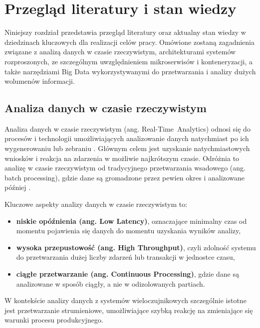 \section{Przegląd literatury i stan wiedzy}
\label{sec:przeglad_literatury}

Niniejszy rozdział przedstawia przegląd literatury oraz aktualny stan wiedzy w dziedzinach kluczowych dla realizacji celów pracy. Omówione zostaną zagadnienia związane z analizą danych w czasie rzeczywistym, architekturami systemów rozproszonych, ze szczególnym uwzględnieniem mikroserwisów i konteneryzacji, a także narzędziami Big Data wykorzystywanymi do przetwarzania i analizy dużych wolumenów informacji.

\subsection{Analiza danych w czasie rzeczywistym}
\label{subsec:analiza_danych}

Analiza danych w czasie rzeczywistym (ang. \mbox{Real-Time Analytics}) odnosi się do procesów i technologii umożliwiających analizowanie danych natychmiast po ich wygenerowaniu lub zebraniu \cite{realtime_analytics}. Głównym celem jest uzyskanie natychmiastowych wniosków i reakcja na zdarzenia w możliwie najkrótszym czasie. Odróżnia to analizę w czasie rzeczywistym od tradycyjnego przetwarzania wsadowego (ang. batch processing), gdzie dane są gromadzone przez pewien okres i analizowane później \cite{data_processing_models}.

\vspace{0.3em}

Kluczowe aspekty analizy danych w czasie rzeczywistym to:

\begin{itemize}
    \item \textbf{niskie opóźnienia (ang. Low Latency)}, oznaczające minimalny czas od momentu pojawienia się danych do momentu uzyskania wyników analizy,
    \item \textbf{wysoka przepustowość (ang. High Throughput)}, czyli zdolność systemu do przetwarzania dużej liczby zdarzeń lub transakcji w jednostce czasu,
    \item \textbf{ciągłe przetwarzanie (ang. Continuous Processing)}, gdzie dane są analizowane w sposób ciągły, a nie w odizolowanych partiach.
\end{itemize}

W kontekście analizy danych z systemów wieloczujnikowych szczególnie istotne jest przetwarzanie strumieniowe, umożliwiające szybką reakcję na zmieniające się warunki procesu produkcyjnego.

